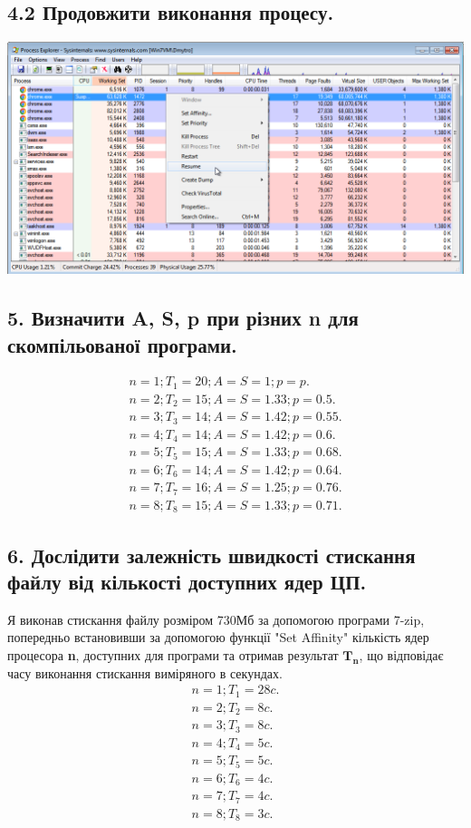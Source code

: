 \documentclass{article}
\begin{document}
\begin{normalsize}
	\subsection*{4.2 Продовжити виконання процесу.}
	\begin{center}
		\includegraphics[scale=0.49]{suspend2}
	\end{center}

	\subsection*{5. Визначити A, S, p при різних n для скомпільованої програми.}
	\begin{gather}\nonumber
		n=1; T_1=20; A=S=1; p=p.\\\nonumber
		n=2; T_2 =15; A=S=1.33; p=0.5.\\\nonumber
		n=3; T_3 =14; A=S=1.42; p=0.55.\\\nonumber
		n=4; T_4 =14; A=S=1.42; p=0.6.\\\nonumber
		n=5; T_5 =15; A=S=1.33; p=0.68.\\\nonumber
		n=6; T_6 =14; A=S=1.42; p=0.64.\\\nonumber
		n=7; T_7 =16; A=S=1.25; p=0.76.\\\nonumber
		n=8; T_8 =15; A=S=1.33; p=0.71.\nonumber
	\end{gather}

	\subsection*{6. Дослідити залежність швидкості стискання файлу від кількості доступних ядер ЦП.}
	Я виконав стискання файлу розміром 730Мб за допомогою програми 7-zip, попередньо встановивши за допомогою функції "Set Affinity" кількість ядер процесора \textbf{n}, доступних для програми та отримав результат $\bm{T_n}$, що відповідає часу виконання стискання виміряного в секундах.
	\begin{gather}\nonumber
		n=1; T_1=28c.\\\nonumber
		n=2; T_2=8c.\\\nonumber
		n=3; T_3=8c.\\\nonumber
		n=4; T_4=5c.\\\nonumber
		n=5; T_5=5c.\\\nonumber
		n=6; T_6=4c.\\\nonumber
		n=7; T_7=4c.\\\nonumber
		n=8; T_8=3c.\nonumber
	\end{gather}


\end{normalsize}
\end{document}
